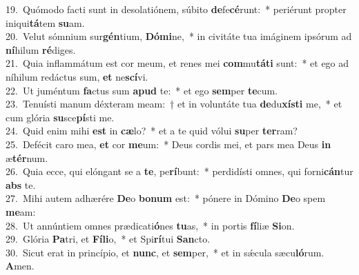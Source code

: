 {19.~}Quómodo facti sunt in desolatiónem, súbito \textbf{de}fe\textbf{cé}runt:~* periérunt propter iniqui\textbf{tá}tem \textbf{su}am.\\
{20.~}Velut sómnium sur\textbf{gén}tium, \textbf{Dó}\textbf{mi}ne,~* in civitáte tua imáginem ipsórum ad \textbf{ní}hilum \textbf{ré}diges.\\
{21.~}Quia inflammátum est cor meum, et renes mei \textbf{com}mu\textbf{tá}\textbf{ti} sunt:~* et ego ad níhilum redáctus sum, \textbf{et} ne\textbf{scí}vi.\\
{22.~}Ut juméntum \textbf{fa}ctus sum \textbf{a}\textbf{pud} te:~* et ego \textbf{sem}per \textbf{te}cum.\\
{23.~}Tenuísti manum déxteram meam:~† et in voluntáte tua \textbf{de}du\textbf{xí}\textbf{sti} me,~* et cum glória \textbf{su}sce\textbf{pí}sti me.\\
{24.~}Quid enim mihi \textbf{est} in \textbf{cæ}lo?~* et a te quid vólui \textbf{su}per \textbf{ter}ram?\\
{25.~}Defécit caro mea, \textbf{et} cor \textbf{me}um:~* Deus cordis mei, et pars mea Deus \textbf{in} æ\textbf{tér}num.\\
{26.~}Quia ecce, qui elóngant se a \textbf{te}, pe\textbf{rí}bunt:~* perdidísti omnes, qui forni\textbf{cán}tur \textbf{abs} te.\\
{27.~}Mihi autem adhærére \textbf{De}o \textbf{bo}\textbf{num} est:~* pónere in Dómino \textbf{De}o spem \textbf{me}am:\\
{28.~}Ut annúntiem omnes prædicati\textbf{ó}nes \textbf{tu}as,~* in portis \textbf{fí}liæ \textbf{Si}on.\\
{29.~}Glória \textbf{Pa}tri, et \textbf{Fí}\textbf{li}o,~* et Spi\textbf{rí}tui \textbf{San}cto.\\
{30.~}Sicut erat in princípio, et \textbf{nunc}, et \textbf{sem}per,~* et in sǽcula sæcu\textbf{ló}rum. \textbf{A}men.\\
